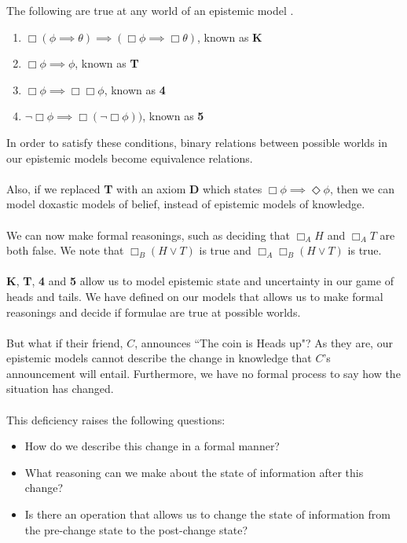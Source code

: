 \begin{propn}
	The following are true at any world of an epistemic model
	\cite{hoek2008dynamic}.
	\begin{enumerate}
		\item $\Box (\phi \implies \theta) \implies (\Box \phi \implies \Box
				\theta)$, known as {\bf K}
		\item $\Box \phi \implies \phi$, known as {\bf T}
		\item $\Box \phi \implies \Box \Box \phi$, known as {\bf 4}
		\item $\neg \Box \phi \implies \Box (\neg \Box \phi))$, known as {\bf 5}
	\end{enumerate}
\end{propn}

In order to satisfy these conditions, binary relations between possible worlds
in our epistemic models become equivalence relations.\\
\\
Also, if we replaced {\bf T} with an axiom {\bf D} which states $\Box \phi
\implies \Diamond \phi$, then we can model doxastic models of belief, instead of
epistemic models of knowledge.\\
\\
We can now make formal reasonings, such as deciding that $\Box_A H$ and $\Box_A
T$ are both false.
We note that $\Box_B (H \lor T)$ is true and $\Box_A \Box_B (H \lor T)$ is
true.\\
\\
{\bf K}, {\bf T}, {\bf 4} and {\bf 5} allow us to model epistemic state and
uncertainty in our game of heads and tails.
We have defined on our models that allows us to make formal reasonings and
decide if formulae are true at possible worlds.\\
\\
But what if their friend, $C$, announces ``The coin is Heads up"?
As they are, our epistemic models cannot describe the change in knowledge that
$C$'s announcement will entail.
Furthermore, we have no formal process to say how the situation has changed.\\
\\
This deficiency raises the following questions:
\begin{itemize}
	\item How do we describe this change in a formal manner?
	\item What reasoning can we make about the state of information after this
	change?
	\item Is there an operation that allows us to change the state of information
	from the pre-change state to the post-change state?
\end{itemize}

